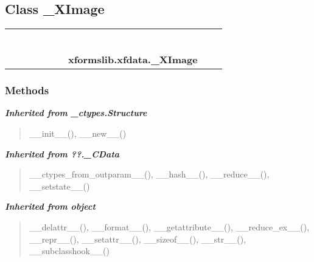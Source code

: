 \subsection{Class \_XImage}

    \label{xformslib:xfdata:_XImage}
\begin{tabular}{cccccccccc}
\multicolumn{2}{r}{\settowidth{\BCL}{object}\multirow{2}{\BCL}{object}}
&&
&&
&&
  \\\cline{3-3}
  &&\multicolumn{1}{c|}{}
&&
&&
&&
  \\
\multicolumn{4}{r}{\settowidth{\BCL}{??.\_CData}\multirow{2}{\BCL}{??.\_CData}}
&&
&&
  \\\cline{5-5}
  &&&&\multicolumn{1}{c|}{}
&&
&&
  \\
\multicolumn{6}{r}{\settowidth{\BCL}{\_ctypes.Structure}\multirow{2}{\BCL}{\_ctypes.Structure}}
&&
  \\\cline{7-7}
  &&&&&&\multicolumn{1}{c|}{}
&&
  \\
&&&&&&\multicolumn{2}{l}{\textbf{xformslib.xfdata.\_XImage}}
\end{tabular}



  \subsubsection{Methods}


\large{\textbf{\textit{Inherited from \_ctypes.Structure}}}

\begin{quote}
\_\_init\_\_(), \_\_new\_\_()
\end{quote}

\large{\textbf{\textit{Inherited from ??.\_CData}}}

\begin{quote}
\_\_ctypes\_from\_outparam\_\_(), \_\_hash\_\_(), \_\_reduce\_\_(), \_\_setstate\_\_()
\end{quote}

\large{\textbf{\textit{Inherited from object}}}

\begin{quote}
\_\_delattr\_\_(), \_\_format\_\_(), \_\_getattribute\_\_(), \_\_reduce\_ex\_\_(), \_\_repr\_\_(), \_\_setattr\_\_(), \_\_sizeof\_\_(), \_\_str\_\_(), \_\_subclasshook\_\_()
\end{quote}

